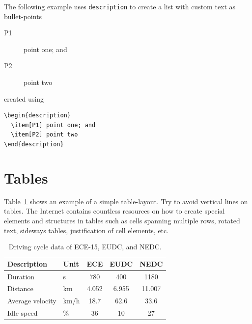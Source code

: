{{{The following example uses \texttt{description} to create a list with custom text as bullet-points
\begin{description}
  \item[P1] point one; and
  \item[P2] point two
\end{description}
created using
\begin{verbatim}
\begin{description}
  \item[P1] point one; and
  \item[P2] point two
\end{description}
\end{verbatim}


\section{Tables}\label{sec:tables}
Table~\ref{tab:table} shows an example of a simple table-layout. Try to avoid vertical lines on tables. The Internet contains countless resources on how to create special elements and structures in tables such as cells spanning multiple rows, rotated text, sideways tables, justification of cell elements, etc.
\begin{table}[ht]
\begin{center}
\caption{Driving cycle data of ECE-15, EUDC, and NEDC.}\vspace{1ex}
\label{tab:table}
\begin{tabular}{llccc}\hline
Description & Unit & ECE & EUDC & NEDC \\ \hline
Duration & s & 780 & 400 & 1180 \\
Distance & km & 4.052 & 6.955 & 11.007 \\
Average velocity & km/h & 18.7 &  62.6 & 33.6 \\
Idle speed & \% & 36 & 10 & 27 \\ \hline
\end{tabular}
\end{center}
\end{table}

}}}

